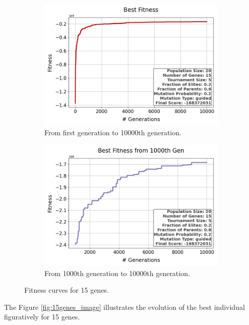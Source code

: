 \documentclass{assignment}
\begin{document}
\begin{figure}[H]
    \begin{subfigure}{0.5\textwidth}
        \includegraphics[width=\textwidth]{figures/best_fitness_output_20_15_5_0.2_0.6_0.2_guided.png}
        \caption{From first generation to 10000th generation.}
    \end{subfigure}\hfill
    \begin{subfigure}{0.5\textwidth}
        \includegraphics[width=\textwidth]{figures/best_fitness_1000_output_20_15_5_0.2_0.6_0.2_guided.png}
        \caption{From 1000th generation to 10000th generation.}
    \end{subfigure}
    \caption{Fitness curves for 15 genes.}
\label{fig:15genes}
\end{figure}

The Figure \ref{fig:15genes_image} illustrates the evolution of the best individual figuratively for 15 genes.
\end{document}

